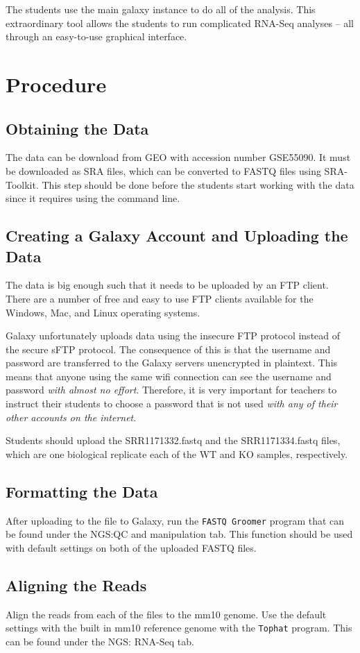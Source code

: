 \documentclass{report}
\begin{document}
The students use the main galaxy instance to do all of the analysis. This extraordinary tool allows the students to run complicated RNA-Seq analyses -- all through an easy-to-use graphical interface.

\section{Procedure}
\subsection{Obtaining the Data}
The data can be download from GEO with accession number GSE55090. It must be downloaded as SRA files, which can be converted to FASTQ files using SRA-Toolkit. This step should be done before the students start working with the data since it requires using the command line.

\subsection{Creating a Galaxy Account and Uploading the Data}
The data is big enough such that it needs to be uploaded by an FTP client. There are a number of free and easy to use FTP clients available for the Windows, Mac, and Linux operating systems. 

Galaxy unfortunately uploads data using the insecure FTP protocol instead of the secure sFTP protocol. The consequence of this is that the username and password are transferred to the Galaxy servers unencrypted in plaintext. This means that anyone using the same wifi connection can see the username and password \emph{with almost no effort}. Therefore, it is very important for teachers to instruct their students to choose a password that is not used \emph{with any of their other accounts on the internet}. 

Students should upload the SRR1171332.fastq and the SRR1171334.fastq files, which are one biological replicate each of the WT and KO samples, respectively.

\subsection{Formatting the Data}
After uploading to the file to Galaxy, run the \texttt{FASTQ Groomer} program that can be found under the NGS:QC and manipulation tab. This function should be used with default settings on both of the uploaded FASTQ files. 

\subsection{Aligning the Reads}
Align the reads from each of the files to the mm10 genome. Use the default settings with the built in mm10 reference genome with the \texttt{Tophat} program. This can be found under the NGS: RNA-Seq tab.
\end{document}
